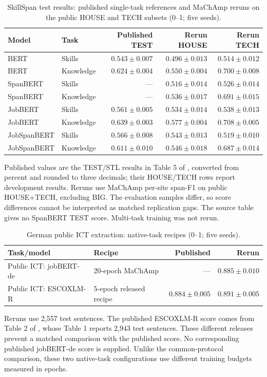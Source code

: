 \begin{table}[H]
\centering\small
\caption{SkillSpan test results: published single-task references and MaChAmp reruns on the public HOUSE and TECH subsets (0--1; five seeds).}
\label{tab:external-native}
\begin{tabularx}{\linewidth}{@{}L P{.15\linewidth}rrr@{}}
\toprule
Model & Task & Published TEST & Rerun HOUSE & Rerun TECH \\
\midrule
BERT & Skills & $0.543\pm0.007$ & $0.496\pm0.013$ & $0.514\pm0.012$ \\
BERT & Knowledge & $0.624\pm0.004$ & $0.550\pm0.004$ & $0.700\pm0.008$ \\
SpanBERT & Skills & --- & $0.516\pm0.014$ & $0.526\pm0.014$ \\
SpanBERT & Knowledge & --- & $0.536\pm0.017$ & $0.691\pm0.015$ \\
JobBERT & Skills & $0.561\pm0.005$ & $0.534\pm0.014$ & $0.538\pm0.013$ \\
JobBERT & Knowledge & $0.639\pm0.003$ & $0.577\pm0.004$ & $0.708\pm0.005$ \\
JobSpanBERT & Skills & $0.566\pm0.008$ & $0.543\pm0.013$ & $0.519\pm0.010$ \\
JobSpanBERT & Knowledge & $0.611\pm0.010$ & $0.546\pm0.018$ & $0.687\pm0.014$ \\
\bottomrule
\end{tabularx}
\par\smallskip\RaggedRight\footnotesize Published values are the TEST/STL results in Table 5 of \citet{zhang2022skillspan}, converted from percent and rounded to three decimals; their HOUSE/TECH rows report development results. Reruns use MaChAmp per-site span-F1 on public HOUSE+TECH, excluding BIG. The evaluation samples differ, so score differences cannot be interpreted as matched replication gaps. The source table gives no SpanBERT TEST score. Multi-task training was not rerun.
\end{table}


\begin{table}[H]
\centering\small
\caption{German public ICT extraction: native-task recipes (0--1; five seeds).}
\label{tab:external-gnehm}
\begin{tabularx}{\linewidth}{@{}L P{.25\linewidth}rr@{}}
\toprule
Task/model & Recipe & Published & Rerun \\
\midrule
Public ICT: jobBERT-de & 20-epoch MaChAmp & --- & $0.885\pm0.010$ \\
Public ICT: ESCOXLM-R & 5-epoch released recipe & $0.884\pm0.005$ & $0.891\pm0.005$ \\
\bottomrule
\end{tabularx}
\par\smallskip\RaggedRight\footnotesize Reruns use 2,557 test sentences. The published ESCOXLM-R score comes from Table 2 of \citet{zhang2023escoxlmr}, whose Table 1 reports 2,943 test sentences. These different releases prevent a matched comparison with the published score. No corresponding published jobBERT-de score is supplied. Unlike the common-protocol comparison, these two native-task configurations use different training budgets measured in epochs.
\end{table}

